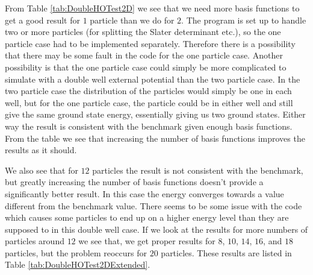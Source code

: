\documentclass[../main.tex]{subfiles}
\begin{document}
From Table \ref{tab:DoubleHOTest2D} we see that we need more basis functions to get a good result for $1$ particle than we do for $2$. The program is set up to handle two or more particles (for splitting the Slater determinant etc.), so the one particle case had to be implemented separately. Therefore there is a possibility that there may be some fault in the code for the one particle case. Another possibility is that the one particle case could simply be more complicated to simulate with a double well external potential than the two particle case. In the two particle case the distribution of the particles would simply be one in each well, but for the one particle case, the particle could be in either well and still give the same ground state energy, essentially giving us two ground states. Either way the result is consistent with the benchmark given enough basis functions. From the table we see that increasing the number of basis functions improves the results as it should. 

We also see that for $12$ particles the result is not consistent with the benchmark, but greatly increasing the number of basis functions doesn't provide a significantly better result. In this case the energy converges towards a value different from the benchmark value. There seems to be some issue with the code which causes some particles to end up on a higher energy level than they are supposed to in this double well case. If we look at the results for more numbers of particles around $12$ we see that, we get proper results for $8$, $10$, $14$, $16$, and $18$ particles, but the problem reoccurs for $20$ particles. These results are listed in Table \ref{tab:DoubleHOTest2DExtended}.
\end{document}
